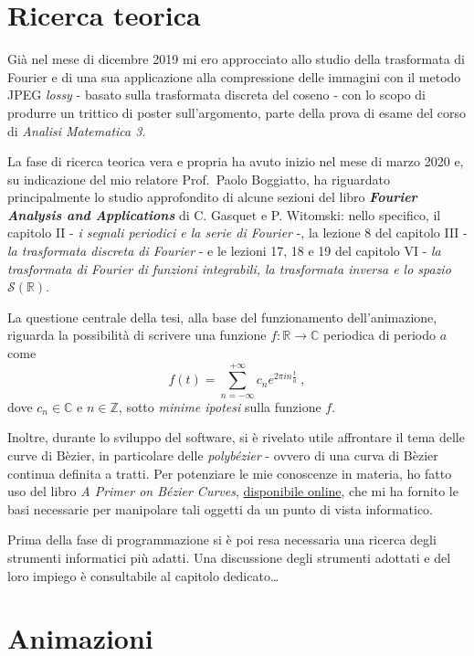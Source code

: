 \documentclass[
]{book}
\begin{document}
\hypertarget{ricerca}{%
\section{Ricerca teorica}\label{ricerca}}

Già nel mese di dicembre 2019 mi ero approcciato allo studio della trasformata di Fourier e di una sua applicazione alla compressione delle immagini con il metodo JPEG \emph{lossy} - basato sulla trasformata discreta del coseno - con lo scopo di produrre un trittico di poster sull'argomento, parte della prova di esame del corso di \emph{Analisi Matematica 3}.

La fase di ricerca teorica vera e propria ha avuto inizio nel mese di marzo 2020 e, su indicazione del mio relatore Prof.~Paolo Boggiatto, ha riguardato principalmente lo studio approfondito di alcune sezioni del libro \emph{\textbf{Fourier Analysis and Applications}} di C. Gasquet e P. Witomski: nello specifico, il capitolo II - \emph{i segnali periodici e la serie di Fourier} -, la lezione 8 del capitolo III - \emph{la trasformata discreta di Fourier} - e le lezioni 17, 18 e 19 del capitolo VI - \emph{la trasformata di Fourier di funzioni integrabili, la trasformata inversa e lo spazio \(\mathcal{S}(\mathbb{R})\)}.

La questione centrale della tesi, alla base del funzionamento dell'animazione, riguarda la possibilità di scrivere una funzione \(f: \mathbb{R} \longrightarrow \mathbb{C}\) periodica di periodo \(a\) come
\[f(t)=\sum_{n=-\infty}^{+\infty}c_{n}e^{2\pi in \frac{t}{a}} \ ,\]
dove \(c_n \in \mathbb{C}\) e \(n \in \mathbb{Z}\), sotto \emph{minime ipotesi} sulla funzione \(f\).

Inoltre, durante lo sviluppo del software, si è rivelato utile affrontare il tema delle curve di Bèzier, in particolare delle \emph{polybézier} - ovvero di una curva di Bèzier continua definita a tratti. Per potenziare le mie conoscenze in materia, ho fatto uso del libro \emph{A Primer on Bézier Curves}, \href{https://pomax.github.io/bezierinfo/}{disponibile online}, che mi ha fornito le basi necessarie per manipolare tali oggetti da un punto di vista informatico.

Prima della fase di programmazione si è poi resa necessaria una ricerca degli strumenti informatici più adatti. Una discussione degli strumenti adottati e del loro impiego è consultabile al capitolo dedicato\ldots{}

\hypertarget{animazioni}{%
\section{Animazioni}\label{animazioni}}
\end{document}
